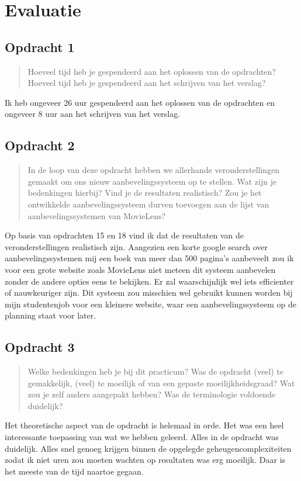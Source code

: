 \documentclass[11pt, a4paper, titlepage, openright]{article}
\begin{document}
\section{Evaluatie}

	\subsection{Opdracht 1}
		\begin{quote}
			Hoeveel tijd heb je gespendeerd aan het oplossen van de opdrachten?
			Hoeveel tijd heb je gespendeerd aan het schrijven van het verslag?
		\end{quote}
        Ik heb ongeveer 26 uur gespendeerd aan het oplossen van de opdrachten en ongeveer 8 uur aan het schrijven van het verslag.

	\subsection{Opdracht 2}
		\begin{quote}
			In de loop van deze opdracht hebben we allerhande veronderstellingen gemaakt om ons nieuw aanbevelingssysteem
            op te stellen. Wat zijn je bedenkingen hierbij? Vind je de resultaten realistisch? Zou je het ontwikkelde
            aanbevelingssysteem durven toevoegen aan de lijst van aanbevelingssystemen van MovieLens?
		\end{quote}
        Op basis van opdrachten 15 en 18 vind ik dat de resultaten van de veronderstellingen realistisch zijn. Aangezien een korte google
        search over aanbevelingssystemen mij een boek van meer dan 500 pagina's aanbeveelt zou ik voor een grote website zoals MovieLens
        niet meteen dit systeem aanbevelen zonder de andere opties eens te bekijken. Er zal waarschijnlijk wel iets efficienter
        of nauwkeuriger zijn. Dit systeem zou misschien wel gebruikt kunnen worden bij mijn studentenjob voor een kleinere website,
        waar een aanbevelingssysteem op de planning staat voor later.

	\subsection{Opdracht 3}
		\begin{quote}
			Welke bedenkingen heb je bij dit practicum? Was de opdracht (veel) te gemakkelijk, (veel) te moeilijk of
			van een gepaste moeilijkheidsgraad? Wat zou je zelf anders aangepakt hebben? Was de terminologie voldoende duidelijk?
		\end{quote}
        Het theoretische aspect van de opdracht is helemaal in orde. Het was een heel interessante toepassing van wat we hebben geleerd.
        Alles in de opdracht was duidelijk. Alles snel genoeg krijgen binnen de opgelegde geheugencomplexiteiten zodat ik niet uren
        zou moeten wachten op resultaten was erg moeilijk. Daar is het meeste van de tijd naartoe gegaan.
\end{document}
